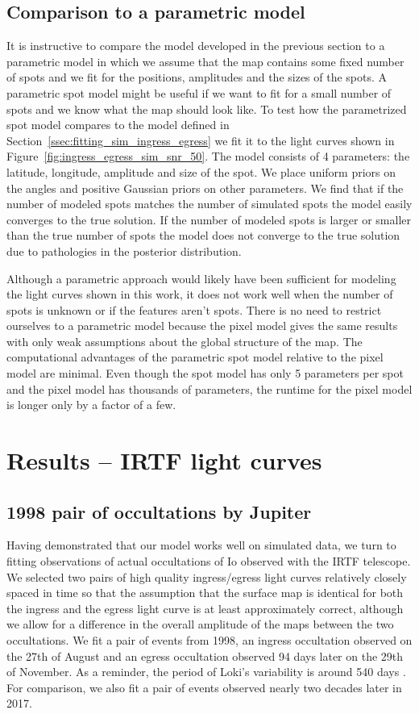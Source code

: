 \documentclass[linenumbers,modern]{aastex62}
\begin{document}
\subsection{Comparison to a parametric model}
It is instructive to compare the model developed in the previous section to a parametric model in which we assume that the map contains some fixed number of spots and we fit for the positions, amplitudes and the sizes of the spots.
A parametric spot model might be useful if we want to fit for a small number of spots and we know what the map should look like.
To test how the parametrized spot model compares to the model defined in Section~\ref{ssec:fitting_sim_ingress_egress} we fit it to the light curves shown in Figure~\ref{fig:ingress_egress_sim_snr_50}. 
The model consists of 4 parameters: the latitude, longitude, amplitude and size of the spot.
We place uniform priors on the angles and positive Gaussian priors on other parameters. 
We find that if the number of modeled spots matches the number of simulated spots the model easily converges to the true solution. 
If the number of modeled spots is larger or smaller than the true number of spots the model does not converge to the true solution due to pathologies in the posterior distribution.

Although a parametric approach would likely have been sufficient for modeling the light curves shown in this work, it does not work well when the number of spots is unknown or if the features aren't spots.
There is no need to restrict ourselves to a parametric model because the pixel model gives the same results with only weak assumptions about the global structure of the map. 
The computational advantages of the parametric spot model relative to the pixel model are minimal. 
Even though the spot model has only 5 parameters per spot and the pixel model has thousands of parameters, the runtime for the pixel model is longer only by a factor of a few. 

\section{Results -- IRTF light curves}
\label{sec:results}
\subsection{1998 pair of occultations by Jupiter}
Having demonstrated that our model works well on simulated data, we turn to fitting observations of actual occultations of Io observed with the IRTF telescope.
We selected two pairs of high quality ingress/egress light curves relatively closely spaced in time so that the assumption that the surface map is identical for both the ingress and the egress light curve is at least approximately correct, although we allow for a difference in the overall amplitude of the maps between the two occultations.
We fit a pair of events from 1998, an ingress occultation observed on the 27th of August and an egress occultation observed  94 days later on the 29th of November.
As a reminder, the period of Loki's variability is around 540 days \citep{rathbun2002}.
For comparison, we also fit a pair of events observed nearly two decades later in 2017.
\end{document}
